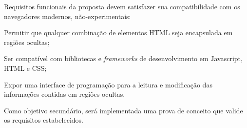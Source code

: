 Requisitos funcionais da proposta devem satisfazer sua compatibilidade com os navegadores modernos, não-experimentais:

\begin{alineas}
	\item Permitir que qualquer combinação de elementos HTML seja encapsulada em regiões ocultas;
	\item Ser compatível com bibliotecas e \textit{frameworks} de desenvolvimento em Javascript, HTML e CSS;
	\item Expor uma interface de programação para a leitura e modificação das informações contidas em regiões ocultas.
\end{alineas}

Como objetivo secundário, será implementada uma prova de conceito que valide os requisitos estabelecidos.